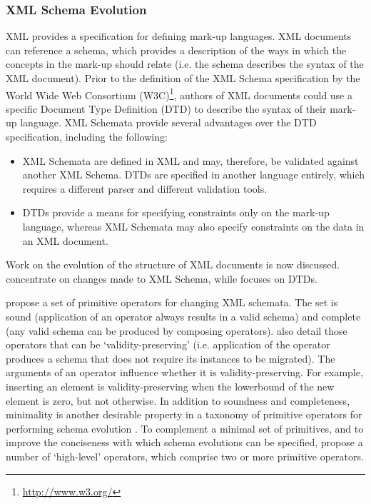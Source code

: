 \subsubsection{XML Schema Evolution}
\label{LitReview:XmlSchemaEvo}
XML provides a specification for defining mark-up languages. XML documents can reference a schema, which provides a description of the ways in which the concepts in the mark-up should relate (i.e. the schema describes the syntax of the XML document). Prior to the definition of the XML Schema specification \cite{xmlschema} by the World Wide Web Consortium (W3C)\footnote{\url{http://www.w3.org/}}, authors of XML documents could use a specific Document Type Definition (DTD) to describe the syntax of their mark-up language. XML Schemata provide several advantages over the DTD specification, including the following:

\begin{itemize}
 \item XML Schemata are defined in XML and may, therefore, be validated against another XML Schema. DTDs are specified in another language entirely, which requires a different parser and different validation tools.
 \item DTDs provide a means for specifying constraints only on the mark-up language, whereas XML Schemata may also specify constraints on the data in an XML document.
\end{itemize}

Work on the evolution of the structure of XML documents is now discussed. \cite{guerrini05impact} concentrate on changes made to XML Schema, while \cite{kramer01xem} focuses on DTDs.

\cite{guerrini05impact} propose a set of primitive operators for changing XML schemata. The set is sound (application of an operator always results in a valid schema) and complete (any valid schema can be produced by composing operators). \cite{guerrini05impact} also detail those operators that can be `validity-preserving' (i.e. application of the operator produces a schema that does not require its instances to be migrated). The arguments of an operator influence whether it is validity-preserving. For example, inserting an element is validity-preserving when the lowerbound of the new element is zero, but not otherwise. In addition to soundness and completeness, minimality is another desirable property in a taxonomy of primitive operators for performing schema evolution \cite{su01xem}. To complement a minimal set of primitives, and to improve the conciseness with which schema evolutions can be specified, \cite{guerrini05impact} propose a number of `high-level' operators, which comprise two or more primitive operators.

